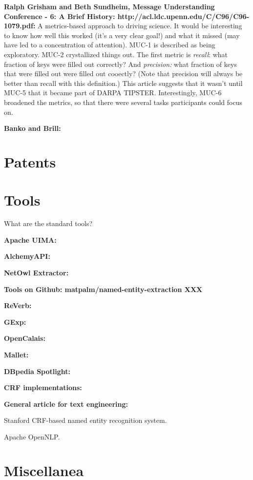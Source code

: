 \textbf{Ralph Grisham and Beth Sundheim, Message Understanding
  Conference - 6: A Brief History:
  http://acl.ldc.upenn.edu/C/C96/C96-1079.pdf:} A metrics-based
approach to driving science.  It would be interesting to know how well
this worked (it's a very clear goal!) and what it missed (may have led
to a concentration of attention).  MUC-1 is described as being
exploratory.  MUC-2 crystallized things out.  The first metric is
\emph{recall}: what fraction of keys were filled out correctly?  And
\emph{precision:} what fraction of keys that were filled out were
filled out cooectly?  (Note that precision will always be better than
recall with this definition.)  This article suggests that it wasn't
until MUC-5 that it became part of DARPA TIPSTER.  Interestingly,
MUC-6 broadened the metrics, so that there were several tasks
participants could focus on.

\textbf{Banko and Brill:}

\section{Patents}


\section{Tools}

What are the standard tools?

\textbf{Apache UIMA:}

\textbf{AlchemyAPI:}

\textbf{NetOwl Extractor:}

\textbf{Tools on Github: matpalm/named-entity-extraction XXX}

\textbf{ReVerb:}

\textbf{GExp:}

\textbf{OpenCalais:}

\textbf{Mallet:}

\textbf{DBpedia Spotlight:}

\textbf{CRF implementations:}

\textbf{General article for text engineering:}

Stanford CRF-based named entity recognition system.

Apache OpenNLP.

\section{Miscellanea}

